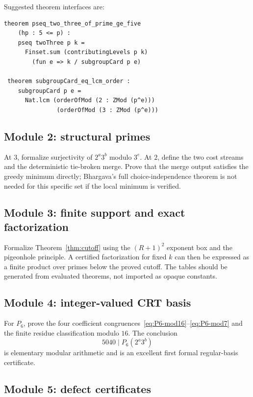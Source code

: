 \documentclass[11pt,oneside]{article}
\theoremstyle{definition}
\theoremstyle{remark}
\begin{document}
Suggested theorem interfaces are:
\begin{lstlisting}[style=leanstyle]
theorem pseq_two_three_of_prime_ge_five
    (hp : 5 <= p) :
    pseq twoThree p k =
      Finset.sum (contributingLevels p k)
        (fun e => k / subgroupCard p e)

 theorem subgroupCard_eq_lcm_order :
    subgroupCard p e =
      Nat.lcm (orderOfMod (2 : ZMod (p^e)))
               (orderOfMod (3 : ZMod (p^e)))
\end{lstlisting}

\subsection{Module 2: structural primes}

At \(3\), formalize surjectivity of \(2^a3^b\) modulo \(3^e\).  At \(2\), define the two cost
streams and the deterministic tie-broken merge.  Prove that the merge output satisfies the
greedy minimum directly; Bhargava's full choice-independence theorem is not needed for this
specific set if the local minimum is verified.

\subsection{Module 3: finite support and exact factorization}

Formalize Theorem~\ref{thm:cutoff} using the \((R+1)^2\) exponent box and the pigeonhole
principle.  A certified factorization for fixed \(k\) can then be expressed as a finite product
over primes below the proved cutoff.  The tables should be generated from evaluated theorems,
not imported as opaque constants.

\subsection{Module 4: integer-valued CRT basis}

For \(P_6\), prove the four coefficient congruences~\eqref{eq:P6-mod16}--\eqref{eq:P6-mod7}
and the finite residue classification modulo \(16\).  The conclusion
\[
 5040\mid P_6(2^a3^b)
\]
is elementary modular arithmetic and is an excellent first formal regular-basis certificate.

\subsection{Module 5: defect certificates}
\end{document}
